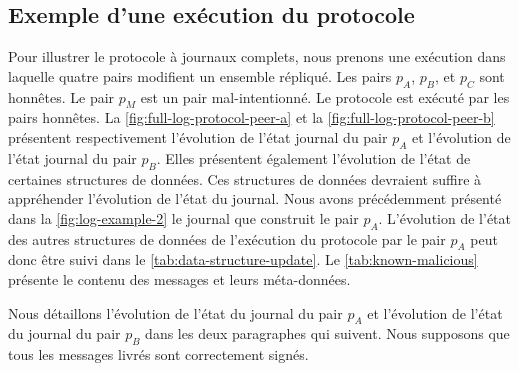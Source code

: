 


\subsection{Exemple d'une exécution du protocole}

Pour illustrer le protocole à journaux complets, nous prenons une exécution dans laquelle quatre pairs modifient un ensemble répliqué.
Les pairs $p_A$, $p_B$, et $p_C$ sont honnêtes.
Le pair $p_M$ est un pair mal-intentionné.
Le protocole est exécuté par les pairs honnêtes.
La \autoref{fig:full-log-protocol-peer-a} et la \autoref{fig:full-log-protocol-peer-b} présentent respectivement l'évolution de l'état journal du pair $p_A$ et l'évolution de l'état journal du pair $p_B$.
Elles présentent également l'évolution de l'état de certaines structures de données.
Ces structures de données devraient suffire à appréhender l'évolution de l'état du journal.
Nous avons précédemment présenté dans la \autoref{fig:log-example-2} le journal que construit le pair $p_A$.
L'évolution de l'état des autres structures de données de l'exécution du protocole par le pair $p_A$ peut donc être suivi dans le \autoref{tab:data-structure-update}.
Le \autoref{tab:known-malicious} présente le contenu des messages et leurs méta-données.

Nous détaillons l'évolution de l'état du journal du pair $p_A$ et l'évolution de l'état du journal du pair $p_B$ dans les deux paragraphes qui suivent.
Nous supposons que tous les messages livrés sont correctement signés.

